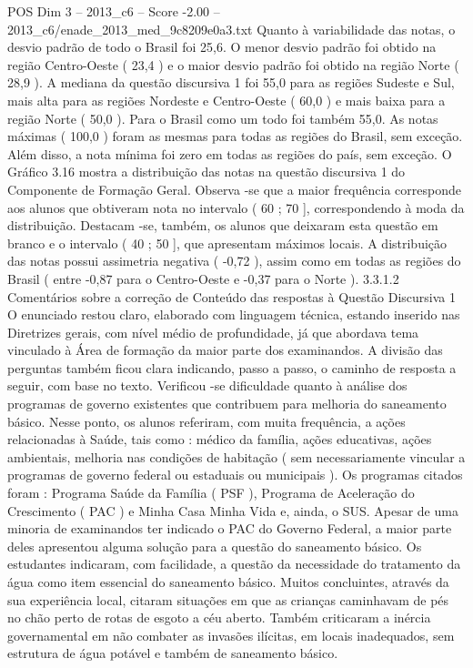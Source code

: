 \begin{textsample}{POS Dim 3 – 2013\_c6 – Score -2.00 – 2013\_c6/enade\_2013\_med\_9c8209e0a3.txt}
Quanto à variabilidade das notas, o desvio padrão de todo o Brasil foi 25,6.
O menor desvio padrão foi obtido na região Centro-Oeste ( 23,4 ) e o maior desvio padrão foi obtido na região Norte ( 28,9 ).
A mediana da questão discursiva 1 foi 55,0 para as regiões Sudeste e Sul, mais alta para as regiões Nordeste e Centro-Oeste ( 60,0 ) e mais baixa para a região Norte ( 50,0 ).
Para o Brasil como um todo foi também 55,0.
As notas máximas ( 100,0 ) foram as mesmas para todas as regiões do Brasil, sem exceção.
Além disso, a nota mínima foi zero em todas as regiões do país, sem exceção.
O Gráfico 3.16 mostra a distribuição das notas na questão discursiva 1 do Componente de Formação Geral.
Observa -se que a maior frequência corresponde aos alunos que obtiveram nota no intervalo ( 60 ; 70 ], correspondendo à moda da distribuição.
Destacam -se, também, os alunos que deixaram esta questão em branco e o intervalo ( 40 ; 50 ], que apresentam máximos locais.
A distribuição das notas possui assimetria negativa ( -0,72 ), assim como em todas as regiões do Brasil ( entre -0,87 para o Centro-Oeste e -0,37 para o Norte ). 3.3.1.2 Comentários sobre a correção de Conteúdo das respostas à Questão Discursiva 1 O enunciado restou claro, elaborado com linguagem técnica, estando inserido nas Diretrizes gerais, com nível médio de profundidade, já que abordava tema vinculado à Área de formação da maior parte dos examinandos.
A divisão das perguntas também ficou clara indicando, passo a passo, o caminho de resposta a seguir, com base no texto.
Verificou -se dificuldade quanto à análise dos programas de governo existentes que contribuem para melhoria do saneamento básico.
Nesse ponto, os alunos referiram, com muita frequência, a ações relacionadas à Saúde, tais como : médico da família, ações educativas, ações ambientais, melhoria nas condições de habitação ( sem necessariamente vincular a programas de governo federal ou estaduais ou municipais ).
Os programas citados foram : Programa Saúde da Família ( PSF ), Programa de Aceleração do Crescimento ( PAC ) e Minha Casa Minha Vida e, ainda, o SUS.
Apesar de uma minoria de examinandos ter indicado o PAC do Governo Federal, a maior parte deles apresentou alguma solução para a questão do saneamento básico.
Os estudantes indicaram, com facilidade, a questão da necessidade do tratamento da água como item essencial do saneamento básico.
Muitos concluintes, através da sua experiência local, citaram situações em que as crianças caminhavam de pés no chão perto de rotas de esgoto a céu aberto.
Também criticaram a inércia governamental em não combater as invasões ilícitas, em locais inadequados, sem estrutura de água potável e também de saneamento básico.

\end{textsample}
